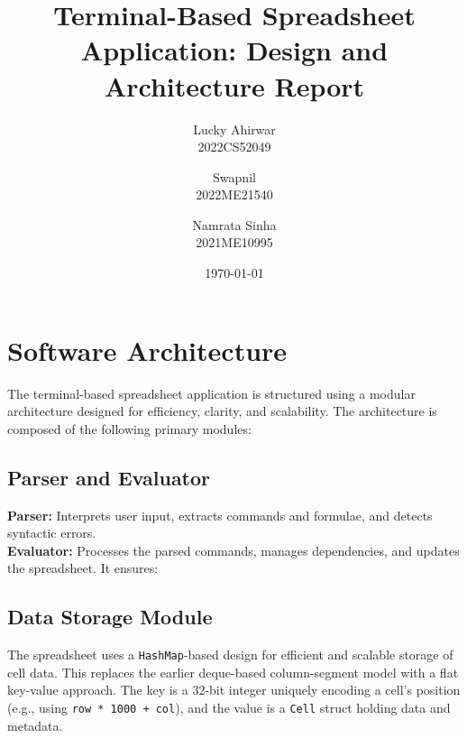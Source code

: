 \documentclass[12pt]{article}
\title{Terminal-Based Spreadsheet Application: Design and Architecture Report}
\author{Lucky Ahirwar \\
        2022CS52049 \\
        \and Swapnil \\
        2022ME21540 \\
        \and Namrata Sinha \\
        2021ME10995 }
\date{\today}
\begin{document}
\maketitle

\section{Software Architecture}

The terminal-based spreadsheet application is structured using a modular architecture designed for efficiency, clarity, and scalability. The architecture is composed of the following primary modules:

\subsection{Parser and Evaluator}
\textbf{Parser:} Interprets user input, extracts commands and formulae, and detects syntactic errors.\\
\textbf{Evaluator:} Processes the parsed commands, manages dependencies, and updates the spreadsheet. It ensures:

\subsection{Data Storage Module}
The spreadsheet uses a \texttt{HashMap}-based design for efficient and scalable storage of cell data. This replaces the earlier deque-based column-segment model with a flat key-value approach. The key is a 32-bit integer uniquely encoding a cell's position (e.g., using \texttt{row * 1000 + col}), and the value is a \texttt{Cell} struct holding data and metadata.
\end{document}
